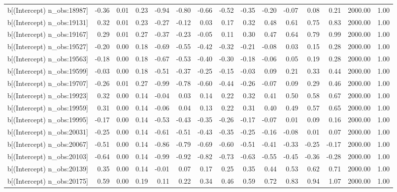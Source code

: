 \begin{table}[ht]
\begin{tabular}{rrrrrrrrrrrrrrr}
  b[(Intercept) n\_obs:18987] & -0.36 & 0.01 & 0.23 & -0.94 & -0.80 & -0.66 & -0.52 & -0.35 & -0.20 & -0.07 & 0.08 & 0.21 & 2000.00 & 1.00 \\ 
  b[(Intercept) n\_obs:19131] & 0.32 & 0.01 & 0.23 & -0.27 & -0.12 & 0.03 & 0.17 & 0.32 & 0.48 & 0.61 & 0.75 & 0.83 & 2000.00 & 1.00 \\ 
  b[(Intercept) n\_obs:19167] & 0.29 & 0.01 & 0.27 & -0.37 & -0.23 & -0.05 & 0.11 & 0.30 & 0.47 & 0.64 & 0.79 & 0.99 & 2000.00 & 1.00 \\ 
  b[(Intercept) n\_obs:19527] & -0.20 & 0.00 & 0.18 & -0.69 & -0.55 & -0.42 & -0.32 & -0.21 & -0.08 & 0.03 & 0.15 & 0.28 & 2000.00 & 1.00 \\ 
  b[(Intercept) n\_obs:19563] & -0.18 & 0.00 & 0.18 & -0.67 & -0.53 & -0.40 & -0.30 & -0.18 & -0.06 & 0.05 & 0.19 & 0.28 & 2000.00 & 1.00 \\ 
  b[(Intercept) n\_obs:19599] & -0.03 & 0.00 & 0.18 & -0.51 & -0.37 & -0.25 & -0.15 & -0.03 & 0.09 & 0.21 & 0.33 & 0.44 & 2000.00 & 1.00 \\ 
  b[(Intercept) n\_obs:19707] & -0.26 & 0.01 & 0.27 & -0.99 & -0.78 & -0.60 & -0.44 & -0.26 & -0.07 & 0.09 & 0.29 & 0.46 & 2000.00 & 1.00 \\ 
  b[(Intercept) n\_obs:19923] & 0.32 & 0.00 & 0.14 & -0.04 & 0.03 & 0.14 & 0.22 & 0.32 & 0.41 & 0.50 & 0.58 & 0.67 & 2000.00 & 1.00 \\ 
  b[(Intercept) n\_obs:19959] & 0.31 & 0.00 & 0.14 & -0.06 & 0.04 & 0.13 & 0.22 & 0.31 & 0.40 & 0.49 & 0.57 & 0.65 & 2000.00 & 1.00 \\ 
  b[(Intercept) n\_obs:19995] & -0.17 & 0.00 & 0.14 & -0.53 & -0.43 & -0.35 & -0.26 & -0.17 & -0.07 & 0.01 & 0.09 & 0.16 & 2000.00 & 1.00 \\ 
  b[(Intercept) n\_obs:20031] & -0.25 & 0.00 & 0.14 & -0.61 & -0.51 & -0.43 & -0.35 & -0.25 & -0.16 & -0.08 & 0.01 & 0.07 & 2000.00 & 1.00 \\ 
  b[(Intercept) n\_obs:20067] & -0.51 & 0.00 & 0.14 & -0.86 & -0.79 & -0.69 & -0.60 & -0.51 & -0.41 & -0.33 & -0.25 & -0.17 & 2000.00 & 1.00 \\ 
  b[(Intercept) n\_obs:20103] & -0.64 & 0.00 & 0.14 & -0.99 & -0.92 & -0.82 & -0.73 & -0.63 & -0.55 & -0.45 & -0.36 & -0.28 & 2000.00 & 1.00 \\ 
  b[(Intercept) n\_obs:20139] & 0.35 & 0.00 & 0.14 & -0.01 & 0.07 & 0.17 & 0.25 & 0.35 & 0.44 & 0.53 & 0.62 & 0.71 & 2000.00 & 1.00 \\ 
  b[(Intercept) n\_obs:20175] & 0.59 & 0.00 & 0.19 & 0.11 & 0.22 & 0.34 & 0.46 & 0.59 & 0.72 & 0.83 & 0.94 & 1.07 & 2000.00 & 1.00 \\ 

\end{tabular}
\end{table}
